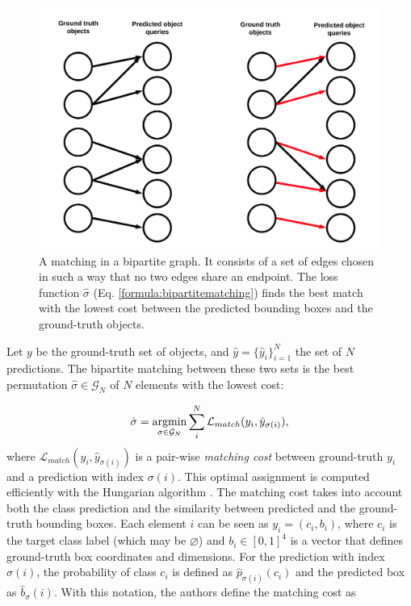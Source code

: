 \begin{figure}[h!]
	\centering
	\includegraphics[width=0.9\linewidth]{images/bipartitematching.png}
	\caption{A matching in a bipartite graph. It consists of a set of edges chosen in such a way that no two edges share an endpoint. The loss function $\hat \sigma$ (Eq. \ref{formula:bipartitematching}) finds the best match with the lowest cost between the predicted bounding boxes and the ground-truth objects.}
	\label{}
\end{figure}

Let $y$ be the ground-truth set of objects, and $\hat y = \{\hat y_i\}^{N}_{i = 1}$ the set of $N$ predictions. The bipartite matching between these two sets is the best permutation $\hat \sigma \in \mathcal{G}_N$ of $N$ elements with the lowest cost:

\begin{equation}
\label{formula:bipartitematching}
\hat \sigma = \operatorname*{argmin}_{\sigma \in \mathcal{G}_N} \sum_{i}^{N} \mathcal{L}_{match}(y_i, \hat y_{\sigma(i)}),
\end{equation}
where $\mathcal{L}_{match}(y_i, \hat y_{\sigma(i)})$ is a pair-wise \textit{matching cost} between  ground-truth $y_i$ and a prediction with index $\sigma(i)$. This optimal assignment is computed efficiently
with the Hungarian algorithm \cite{hungarian}. The matching cost takes into account both the class prediction and the similarity between predicted and the ground-truth bounding boxes. Each element $i$ can be seen as $y_i = (c_i
, b_i)$, where $c_i$
is the target class label (which may be $\varnothing$) and $b_i \in [0, 1]^{4}$
is a vector that defines ground-truth box coordinates and dimensions. For the
prediction with index $\sigma(i)$, the probability of class $c_i$ is defined as $ \hat p_{\sigma(i)}(c_i)$ and
the predicted box as $\hat b_\sigma(i)$. With this notation, the authors define the matching cost as


